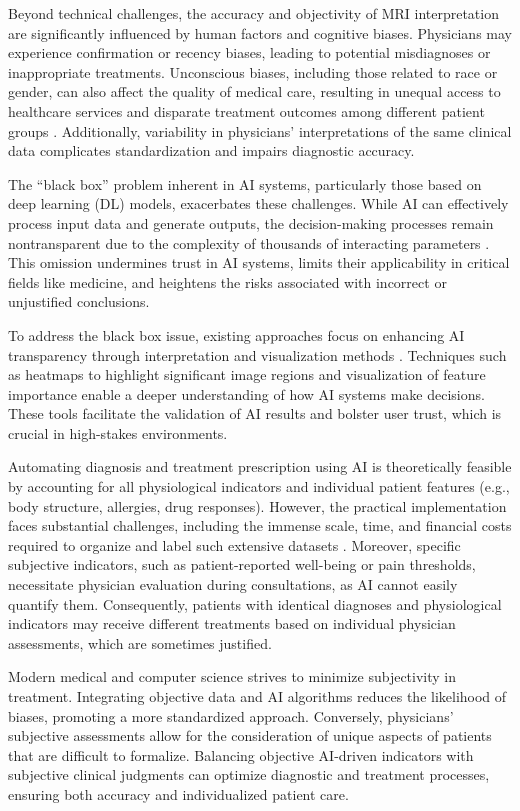 \documentclass[fleqn,10pt]{wlscirep}
\begin{document}
Beyond technical challenges, the accuracy and objectivity of MRI interpretation are significantly influenced by human factors and cognitive biases. Physicians may experience confirmation or recency biases, leading to potential misdiagnoses or inappropriate treatments. Unconscious biases, including those related to race or gender, can also affect the quality of medical care, resulting in unequal access to healthcare services and disparate treatment outcomes among different patient groups \cite{DeBenedectis:2022,Meidert:2023}. Additionally, variability in physicians' interpretations of the same clinical data complicates standardization and impairs diagnostic accuracy.

The ``black box'' problem inherent in AI systems, particularly those based on deep learning (DL) models, exacerbates these challenges. While AI can effectively process input data and generate outputs, the decision-making processes remain nontransparent due to the complexity of thousands of interacting parameters \cite{Radiuk:2024a}. This omission undermines trust in AI systems, limits their applicability in critical fields like medicine, and heightens the risks associated with incorrect or unjustified conclusions.

To address the black box issue, existing approaches focus on enhancing AI transparency through interpretation and visualization methods \cite{Shick:2024}. Techniques such as heatmaps to highlight significant image regions and visualization of feature importance enable a deeper understanding of how AI systems make decisions. These tools facilitate the validation of AI results and bolster user trust, which is crucial in high-stakes environments.

Automating diagnosis and treatment prescription using AI is theoretically feasible by accounting for all physiological indicators and individual patient features (e.g., body structure, allergies, drug responses). However, the practical implementation faces substantial challenges, including the immense scale, time, and financial costs required to organize and label such extensive datasets \cite{Radiuk:2021}. Moreover, specific subjective indicators, such as patient-reported well-being or pain thresholds, necessitate physician evaluation during consultations, as AI cannot easily quantify them. Consequently, patients with identical diagnoses and physiological indicators may receive different treatments based on individual physician assessments, which are sometimes justified.

Modern medical and computer science strives to minimize subjectivity in treatment. Integrating objective data and AI algorithms reduces the likelihood of biases, promoting a more standardized approach. Conversely, physicians' subjective assessments allow for the consideration of unique aspects of patients that are difficult to formalize. Balancing objective AI-driven indicators with subjective clinical judgments can optimize diagnostic and treatment processes, ensuring both accuracy and individualized patient care.
\end{document}
